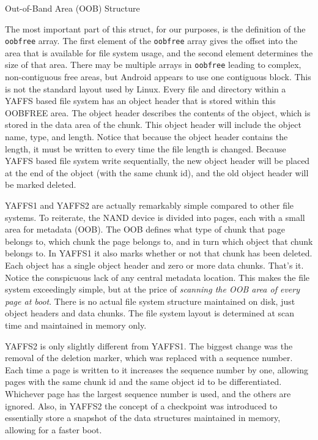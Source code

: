 \begin{table}[htb]

\caption{Out-of-Band Area (OOB) Structure}
\label{tab:oob}
\end{table}

The most important part of this struct, for our purposes, is the definition of the \texttt{oobfree} array.  The first element of the
\texttt{oobfree} array gives the offset into the area that is available for file system usage, and the second element determines the
size of that area.  There may be multiple arrays in \texttt{oobfree} leading to complex, non-contiguous free areas, but Android
appears to use one contiguous block.  This is not the standard layout used by Linux. Every file and directory within a YAFFS based
file system has an object header that is stored within this OOBFREE area. The object header describes the contents of the object,
which is stored in the data area of the chunk. This object header will include the object name, type, and length.  Notice that
because the object header contains the length, it must be written to every time the file length is changed.  Because YAFFS based
file system write sequentially, the new object header will be placed at the end of the object (with the same chunk id), and the old
object header will be marked deleted. 

YAFFS1 and YAFFS2 are actually remarkably simple compared to other file systems. To reiterate, the NAND device is divided into
pages, each with a small area for metadata (OOB).  The OOB defines what type of chunk that page belongs to, which chunk the page
belongs to, and in turn which object that chunk belongs to.  In YAFFS1 it also marks whether or not that chunk has been deleted.
Each object has a single object header and zero or more data chunks.  That's it.  Notice the conspicuous lack of any central
metadata location.  This makes the file system exceedingly simple, but at the price of \emph{scanning the OOB area of every page at
boot}.  There is no actual file system structure maintained on disk, just object headers and data chunks.  The file system layout is
determined at scan time and maintained in memory only. 

YAFFS2 is only slightly different from YAFFS1. The biggest change was the removal of the deletion marker, which was replaced with a
sequence number. Each time a page is written to it increases the sequence number by one, allowing pages with the same chunk id and
the same object id to be differentiated.  Whichever page has the largest sequence number is used, and the others are ignored.  Also,
in YAFFS2 the concept of a checkpoint was introduced to essentially store a snapshot of the data structures maintained in memory,
allowing for a faster boot.

